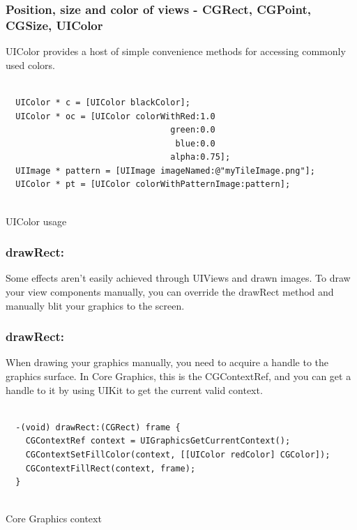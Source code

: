 \documentclass[10pt]{beamer}
\begin{document}
\begin{frame}[fragile]
  \frametitle{Position, size and color of views - CGRect, CGPoint, CGSize, UIColor}
  UIColor provides a host of simple convenience methods for accessing commonly used colors.
\begin{listing}[H]
    \begin{verbatim}
  
  UIColor * c = [UIColor blackColor];
  UIColor * oc = [UIColor colorWithRed:1.0
                                 green:0.0
                                  blue:0.0
                                 alpha:0.75];
  UIImage * pattern = [UIImage imageNamed:@"myTileImage.png"];
  UIColor * pt = [UIColor colorWithPatternImage:pattern];
              
  \end{verbatim}
    \caption{UIColor usage}
    \label{listing:32}
  \end{listing}

\end{frame}

    
\begin{frame}[fragile]
  \frametitle{drawRect:}
  Some effects aren't easily achieved through UIViews and drawn images.  To draw your view components manually, you can override the drawRect method and manually blit your graphics to the screen.

\end{frame}

\begin{frame}[fragile]
  \frametitle{drawRect:}
  When drawing your graphics manually, you need to acquire a handle to the graphics surface.  In Core Graphics, this is the CGContextRef, and you can get a handle to it by using UIKit to get the current valid context.
\begin{listing}[H]
    \begin{verbatim}
  
  -(void) drawRect:(CGRect) frame {
    CGContextRef context = UIGraphicsGetCurrentContext();
    CGContextSetFillColor(context, [[UIColor redColor] CGColor]);
    CGContextFillRect(context, frame);
  }
              
  \end{verbatim}
    \caption{Core Graphics context}
    \label{listing:33}
  \end{listing}

\end{frame}
\end{document}

